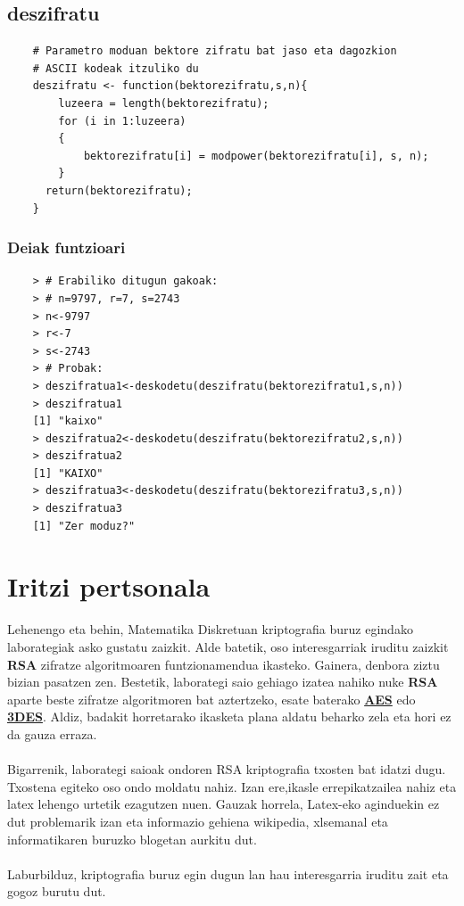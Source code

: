 \documentclass[12pt]{basque-book}
\begin{document}
\newpage

\section{deszifratu}
\begin{verbatim}
    # Parametro moduan bektore zifratu bat jaso eta dagozkion 
    # ASCII kodeak itzuliko du
    deszifratu <- function(bektorezifratu,s,n){
        luzeera = length(bektorezifratu);
        for (i in 1:luzeera)
        {
            bektorezifratu[i] = modpower(bektorezifratu[i], s, n);
        }
      return(bektorezifratu);
    }
\end{verbatim}

\subsection{Deiak funtzioari}
\begin{verbatim}
    > # Erabiliko ditugun gakoak:
    > # n=9797, r=7, s=2743
    > n<-9797
    > r<-7
    > s<-2743
    > # Probak:
    > deszifratua1<-deskodetu(deszifratu(bektorezifratu1,s,n))
    > deszifratua1
    [1] "kaixo"
    > deszifratua2<-deskodetu(deszifratu(bektorezifratu2,s,n))
    > deszifratua2
    [1] "KAIXO"
    > deszifratua3<-deskodetu(deszifratu(bektorezifratu3,s,n))
    > deszifratua3
    [1] "Zer moduz?"
\end{verbatim}


\chapter{Iritzi pertsonala}

Lehenengo eta behin, Matematika Diskretuan kriptografia buruz egindako laborategiak asko gustatu zaizkit. Alde batetik, oso interesgarriak iruditu zaizkit \textbf{RSA} zifratze algoritmoaren funtzionamendua ikasteko. Gainera, denbora ziztu bizian pasatzen zen. Bestetik, laborategi saio gehiago izatea nahiko nuke \textbf{RSA} aparte beste zifratze algoritmoren bat aztertzeko, esate baterako \href{https://eu.wikipedia.org/wiki/Advanced_Encryption_Standard}{\textbf{AES}} edo \href{https://eu.wikipedia.org/wiki/DES_Hirukoitza}{\textbf{3DES}}. Aldiz, badakit horretarako ikasketa plana aldatu beharko zela eta hori ez da gauza erraza.
\\\\
Bigarrenik, laborategi saioak ondoren RSA kriptografia txosten bat idatzi dugu. Txostena egiteko oso ondo moldatu nahiz. Izan ere,ikasle errepikatzailea nahiz eta latex lehengo urtetik ezagutzen nuen. Gauzak horrela, Latex-eko aginduekin ez dut problemarik izan eta informazio gehiena wikipedia, xlsemanal eta informatikaren buruzko blogetan aurkitu dut.
\\\\
Laburbilduz, kriptografia buruz egin dugun lan hau interesgarria iruditu zait eta gogoz burutu dut.
\end{document}
